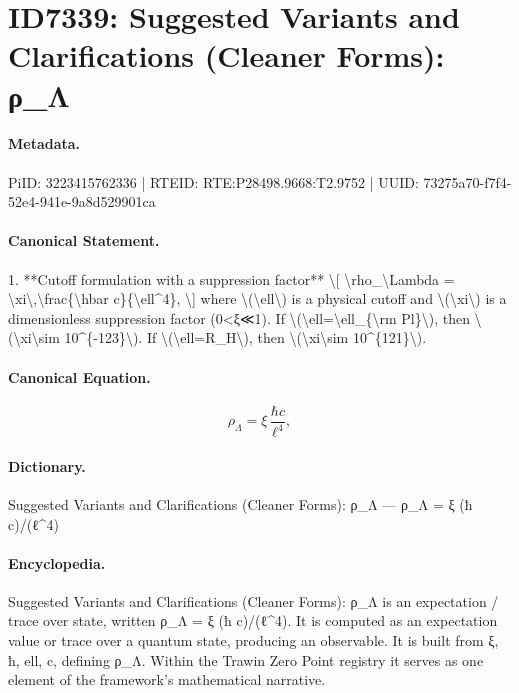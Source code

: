 \section*{ID7339: Suggested Variants and Clarifications (Cleaner Forms): ρ\_Λ}
\paragraph{Metadata.}
PiID: 3223415762336 | RTEID: RTE:P28498.9668:T2.9752 | UUID: 73275a70-f7f4-52e4-941e-9a8d529901ca

\paragraph{Canonical Statement.}
1. **Cutoff formulation with a suppression factor** \textbackslash{}[ \textbackslash{}rho\_\textbackslash{}Lambda = \textbackslash{}xi\textbackslash{},\textbackslash{}frac\{\textbackslash{}hbar c\}\{\textbackslash{}ell\textasciicircum{}4\}, \textbackslash{}] where \textbackslash{}(\textbackslash{}ell\textbackslash{}) is a physical cutoff and \textbackslash{}(\textbackslash{}xi\textbackslash{}) is a dimensionless suppression factor (0<ξ≪1). If \textbackslash{}(\textbackslash{}ell=\textbackslash{}ell\_\{\textbackslash{}rm Pl\}\textbackslash{}), then \textbackslash{}(\textbackslash{}xi\textbackslash{}sim 10\textasciicircum{}\{-123\}\textbackslash{}). If \textbackslash{}(\textbackslash{}ell=R\_H\textbackslash{}), then \textbackslash{}(\textbackslash{}xi\textbackslash{}sim 10\textasciicircum{}\{121\}\textbackslash{}).

\paragraph{Canonical Equation.}
\[
\rho_\Lambda = \xi\,\frac{\hbar c}{\ell^4},
\]

\paragraph{Dictionary.}
Suggested Variants and Clarifications (Cleaner Forms): ρ\_Λ — ρ\_Λ = ξ (ħ c)/(ℓ\textasciicircum{}4)

\paragraph{Encyclopedia.}
Suggested Variants and Clarifications (Cleaner Forms): ρ\_Λ is an expectation / trace over state, written ρ\_Λ = ξ (ħ c)/(ℓ\textasciicircum{}4). It is computed as an expectation value or trace over a quantum state, producing an observable. It is built from ξ, ħ, ell, c, defining ρ\_Λ. Within the Trawin Zero Point registry it serves as one element of the framework's mathematical narrative.
